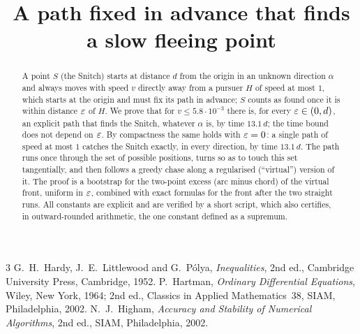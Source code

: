 \documentclass[11pt]{article}
\title{A path fixed in advance that finds a slow fleeing point}
\author{}
\date{}
\begin{document}
\maketitle

\begin{abstract}
A point $S$ (the Snitch) starts at distance $d$ from the origin in an unknown direction $\alpha$ and always moves with speed $v$
directly away from a pursuer $H$ of speed at most $1$, which starts at the origin and must fix its path in advance; $S$ counts as
found once it is within distance $\varepsilon$ of $H$. We prove that for $v\le5.8\cdot10^{-3}$ there is, for every $\varepsilon\in(0,d)$, an
explicit path that finds the Snitch, whatever $\alpha$ is, by time $13.1\,d$; the time bound does not depend on $\varepsilon$. By
compactness the same holds with $\varepsilon=0$: a single path of speed at most $1$ catches the Snitch exactly, in every direction, by
time $13.1\,d$. The path runs once through the set of possible positions, turns so as to touch this set tangentially, and then
follows a greedy chase along a regularised (``virtual'') version of it. The proof is a bootstrap for the two-point excess (arc
minus chord) of the virtual front, uniform in $\varepsilon$, combined with exact formulas for the front after the two straight runs.
All constants are explicit and are verified by a short script, which also certifies, in outward-rounded arithmetic, the one constant defined as a supremum.
\end{abstract}










\begin{thebibliography}{3}
 G.~H.~Hardy, J.~E.~Littlewood and G.~P\'olya, \emph{Inequalities}, 2nd ed., Cambridge University Press,
Cambridge, 1952.
 P.~Hartman, \emph{Ordinary Differential Equations}, Wiley, New York, 1964; 2nd ed., Classics in Applied
Mathematics~38, SIAM, Philadelphia, 2002.
 N.~J.~Higham, \emph{Accuracy and Stability of Numerical Algorithms}, 2nd ed., SIAM, Philadelphia, 2002.
\end{thebibliography}

\appendix

\end{document}
